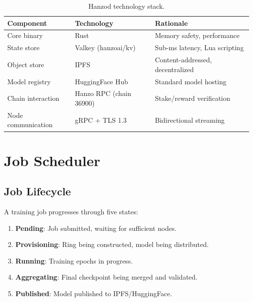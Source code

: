 \documentclass[11pt,letterpaper]{article}
\begin{document}
\begin{table}[t]
\centering
\begin{tabular}{lll}
\toprule
\textbf{Component} & \textbf{Technology} & \textbf{Rationale} \\
\midrule
Core binary & Rust & Memory safety, performance \\
State store & Valkey (hanzoai/kv) & Sub-ms latency, Lua scripting \\
Object store & IPFS & Content-addressed, decentralized \\
Model registry & HuggingFace Hub & Standard model hosting \\
Chain interaction & Hanzo RPC (chain 36900) & Stake/reward verification \\
Node communication & gRPC + TLS 1.3 & Bidirectional streaming \\
\bottomrule
\end{tabular}
\caption{Hanzod technology stack.}
\label{tab:stack}
\end{table}

\section{Job Scheduler}
\label{sec:scheduler}

\subsection{Job Lifecycle}

A training job progresses through five states:

\begin{enumerate}
    \item \textbf{Pending}: Job submitted, waiting for sufficient nodes.
    \item \textbf{Provisioning}: Ring being constructed, model being distributed.
    \item \textbf{Running}: Training epochs in progress.
    \item \textbf{Aggregating}: Final checkpoint being merged and validated.
    \item \textbf{Published}: Model published to IPFS/HuggingFace.
\end{enumerate}
\end{document}
